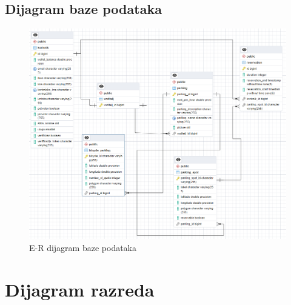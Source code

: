 \subsection{Dijagram baze podataka}


\begin{figure}[H]
	\includegraphics[width=\textwidth]{slike/baza_podataka.png} %
	\centering
	\caption{E-R dijagram baze podataka}
\end{figure}








\eject


\section{Dijagram razreda}

	

